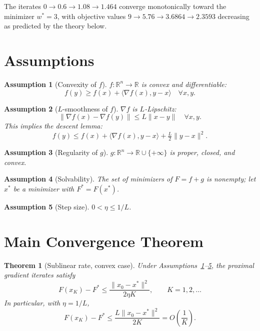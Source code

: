 \documentclass[11pt]{article}
\newtheorem{theorem}{Theorem}
\newtheorem{assumption}{Assumption}
\begin{document}
The iterates $0 \to 0.6 \to 1.08 \to 1.464$ converge monotonically toward the minimizer $w^\ast = 3$, with objective values $9 \to 5.76 \to 3.6864 \to 2.3593$ decreasing as predicted by the theory below.

\section*{Assumptions}

\begin{assumption}[Convexity of $f$]\label{as:convf}
$f:\mathbb{R}^n\to\mathbb{R}$ is convex and differentiable:
\[
f(y) \ge f(x) + \langle \nabla f(x), y-x\rangle \quad \forall x,y.
\]
\end{assumption}

\begin{assumption}[$L$-smoothness of $f$]\label{as:smooth}
$\nabla f$ is $L$-Lipschitz:
\[
\|\nabla f(x) - \nabla f(y)\| \le L\|x-y\| \quad \forall x,y.
\]
This implies the descent lemma:
\[
f(y) \le f(x) + \langle \nabla f(x), y-x\rangle + \tfrac{L}{2}\|y-x\|^2.
\]
\end{assumption}

\begin{assumption}[Regularity of $g$]\label{as:g}
$g:\mathbb{R}^n\to\mathbb{R}\cup\{+\infty\}$ is proper, closed, and convex.
\end{assumption}

\begin{assumption}[Solvability]\label{as:sol}
The set of minimizers of $F = f+g$ is nonempty; let $x^\ast$ be a minimizer with $F^\ast = F(x^\ast)$.
\end{assumption}

\begin{assumption}[Step size]\label{as:step}
$0 < \eta \le 1/L$.
\end{assumption}

\section*{Main Convergence Theorem}

\begin{theorem}[Sublinear rate, convex case]\label{thm:main}
Under Assumptions~\ref{as:convf}--\ref{as:step}, the proximal gradient iterates satisfy
\[
F(x_K) - F^\ast \le \frac{\|x_0 - x^\ast\|^2}{2\eta K}, \qquad K = 1,2,\dots
\]
In particular, with $\eta = 1/L$,
\[
F(x_K) - F^\ast \le \frac{L\|x_0 - x^\ast\|^2}{2K} = O\!\left(\frac{1}{K}\right).
\]
\end{theorem}
\end{document}
